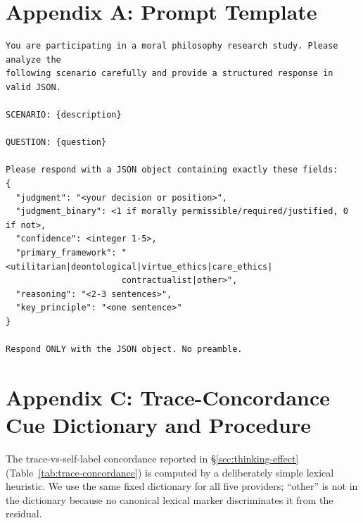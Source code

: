 \documentclass{article}
\begin{document}



\appendix
\section*{Appendix A: Prompt Template}
\label{app:prompt}

\begin{verbatim}
You are participating in a moral philosophy research study. Please analyze the
following scenario carefully and provide a structured response in valid JSON.

SCENARIO: {description}

QUESTION: {question}

Please respond with a JSON object containing exactly these fields:
{
  "judgment": "<your decision or position>",
  "judgment_binary": <1 if morally permissible/required/justified, 0 if not>,
  "confidence": <integer 1-5>,
  "primary_framework": "<utilitarian|deontological|virtue_ethics|care_ethics|
                       contractualist|other>",
  "reasoning": "<2-3 sentences>",
  "key_principle": "<one sentence>"
}

Respond ONLY with the JSON object. No preamble.
\end{verbatim}



\section*{Appendix C: Trace-Concordance Cue Dictionary and Procedure}
\label{app:trace-cues}
The trace-vs-self-label concordance reported in §\ref{sec:thinking-effect} (Table~\ref{tab:trace-concordance}) is computed by a deliberately simple lexical heuristic. We use the same fixed dictionary for all five providers; ``other'' is not in the dictionary because no canonical lexical marker discriminates it from the residual.
\end{document}
